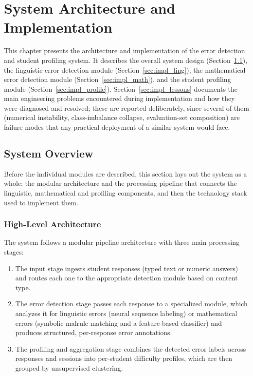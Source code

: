 
\chapter{System Architecture and Implementation} %
\label{chap:Chapter4} %


This chapter presents the architecture and implementation of the error detection and student profiling system. It describes the overall system design (Section~\ref{sec:impl_arch}), the linguistic error detection module (Section~\ref{sec:impl_ling}), the mathematical error detection module (Section~\ref{sec:impl_math}), and the student profiling module (Section~\ref{sec:impl_profile}). Section~\ref{sec:impl_lessons} documents the main engineering problems encountered during implementation and how they were diagnosed and resolved; these are reported deliberately, since several of them (numerical instability, class-imbalance collapse, evaluation-set composition) are failure modes that any practical deployment of a similar system would face.

\section{System Overview}
\label{sec:impl_arch}

Before the individual modules are described, this section lays out the system as a whole: the modular architecture and the processing pipeline that connects the linguistic, mathematical and profiling components, and then the technology stack used to implement them.

\subsection{High-Level Architecture}
\label{sec:impl_arch_overview}

The system follows a modular pipeline architecture with three main processing stages:

\begin{enumerate}
    \item The input stage ingests student responses (typed text or numeric answers) and routes each one to the appropriate detection module based on content type.
    \item The error detection stage passes each response to a specialized module, which analyzes it for linguistic errors (neural sequence labeling) or mathematical errors (symbolic malrule matching and a feature-based classifier) and produces structured, per-response error annotations.
    \item The profiling and aggregation stage combines the detected error labels across responses and sessions into per-student difficulty profiles, which are then grouped by unsupervised clustering.
\end{enumerate}

